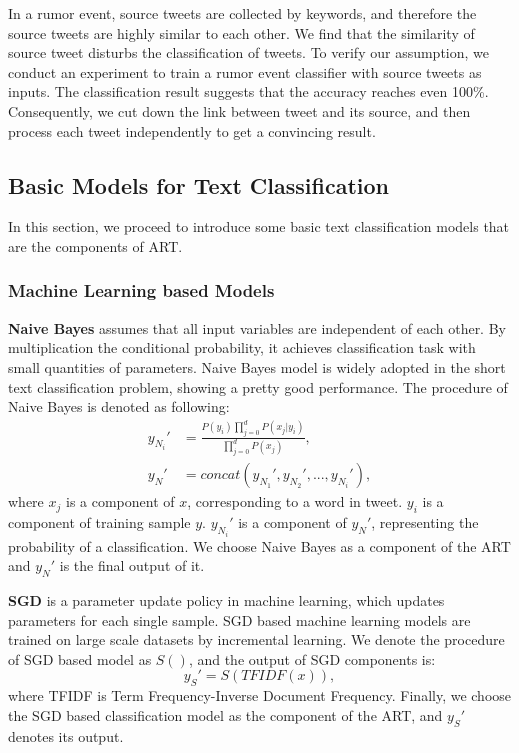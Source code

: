 In a rumor event, source tweets are collected by keywords, and therefore the source tweets are highly similar to each other. We find that the similarity of source tweet disturbs the classification of tweets. To verify our assumption, we conduct an experiment to train a rumor event classifier with source tweets as inputs. The classification result suggests that the accuracy reaches even 100\%. Consequently, we cut down the link between tweet and its source, and then process each tweet independently to get a convincing result. 

\subsection{Basic Models for Text Classification}
\label{sec:deeplearning_model} 
In this section, we proceed to introduce some basic text classification models that are the components of ART.

\subsubsection{Machine Learning based Models}
\textbf{Naive Bayes} \cite{DBLP:journals/ml/DomingosP97} assumes that all input variables are independent of each other. By multiplication the conditional probability, it achieves classification task with small quantities of parameters. Naive Bayes model is widely adopted in the short text classification problem, showing a pretty good performance. The procedure of Naive Bayes is denoted as following:
\begin{align}\label{eq:nb}
y_{N_{i}}' &= \frac{P(y_i)\prod_{j = 0}^d P(x_j|y_i)}{\prod_{j = 0}^d P(x_j)},\\
y_N' &= concat(y_{N_{1}}',y_{N_{2}}',..., y_{N_{i}}'),
\end{align}
where $x_j$ is a component of $x$, corresponding to a word in tweet.  $y_i$ is a component of training sample $y$. $y_{N_{i}}'$ is a component of $y_N'$, representing the probability of a classification. We choose Naive Bayes as  a component of the ART and  $y_N'$ is the final output of it.

\textbf{SGD} \cite{avriel2003nonlinear} is a parameter update policy in machine learning, which updates parameters for each single sample. SGD based machine learning models are trained on large scale datasets by incremental learning. We denote the procedure of SGD based model as $S()$, and the output of SGD components is:
\begin{equation}\label{eq:sgd}
y_S' = S(TFIDF(x)),
\end{equation}
where TFIDF is Term Frequency-Inverse Document Frequency. Finally, we choose the SGD based classification model as the component of the ART, and $y_S'$ denotes its output.

